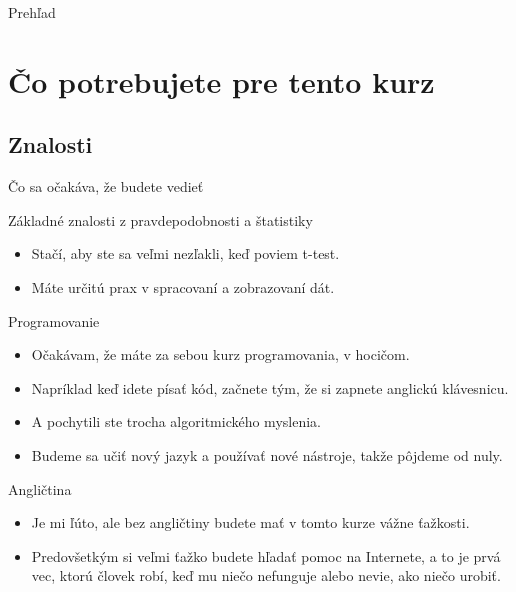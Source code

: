 
\begin{frame}{Prehľad}
\tableofcontents
\end{frame}

\section{Čo potrebujete pre tento kurz}

\subsection{Znalosti}
\begin{frame}{Čo sa očakáva, že budete vedieť}
	\begin{block}{Základné znalosti z pravdepodobnosti a štatistiky}
		\begin{itemize}
			\item Stačí, aby ste sa veľmi nezľakli, keď poviem t-test.
			\item Máte určitú prax v spracovaní a zobrazovaní dát.
		\end{itemize}
	\end{block}
	\begin{block}{Programovanie}
		\begin{itemize}
			\item Očakávam, že máte za sebou kurz programovania, v hocičom.
			\item Napríklad keď idete písať kód, začnete tým, že si zapnete anglickú klávesnicu.
			\item A pochytili ste trocha algoritmického myslenia. 
			\item Budeme sa učiť nový jazyk a používať nové nástroje, takže pôjdeme od nuly.
		\end{itemize}
	\end{block}
	\begin{block}{Angličtina}
		\begin{itemize}
			\item Je mi ľúto, ale bez angličtiny budete mať v tomto kurze vážne ťažkosti.
			\item Predovšetkým si veľmi ťažko budete hľadať pomoc na Internete, a to je prvá vec, ktorú človek robí, keď mu niečo nefunguje alebo nevie, ako niečo urobiť. 
		\end{itemize}
	\end{block}
\end{frame}

